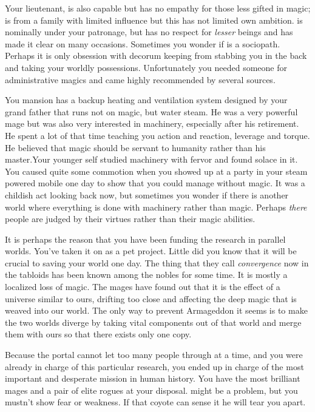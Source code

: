 \documentclass[char]{guildcamp3}
\begin{document}
Your lieutenant, \cNobleTwo{\intro} is also capable but has no empathy for those less gifted in magic;  is from a family with limited influence but this has not limited  own ambition. \cNobleTwo{} is nominally under your patronage, but  has no respect for \emph{lesser} beings and has made it clear on many occasions. Sometimes you wonder if \cNobleTwo{} is a sociopath. Perhaps it is only  obsession with decorum keeping  from stabbing you in the back and taking your worldly possessions. Unfortunately you needed someone for administrative magics and \cNobleTwo{} came highly recommended by several sources. 

You mansion has a backup heating and ventilation system designed by your grand father that runs not on magic, but water steam. He was a very powerful mage but was also very interested in machinery, especially after his retirement. He spent a lot of that time teaching you action and reaction, leverage and torque. He believed that magic should be servant to humanity rather than his master.Your younger self studied machinery with fervor and found solace in it. You caused quite some commotion when you showed up at a party in your steam powered mobile one day to show that you could manage without magic. It was a childish act looking back now, but sometimes you wonder if there is another world where everything is done with machinery rather than magic. Perhaps \emph{there} people are judged by their virtues rather than their magic abilities.

It is perhaps the reason that you have been funding the research in parallel worlds. You've taken it on as a pet project. Little did you know that it will be crucial to saving your world one day. The thing that they call \emph{convergence} now in the tabloids has been known among the nobles for some time. It is mostly a localized loss of magic. The mages have found out that it is the effect of a universe similar to ours, drifting too close and affecting the deep magic that is weaved into our world. The only way to prevent Armageddon it seems is to make the two worlds diverge by taking vital components out of that world and merge them with ours so that there exists only one copy.  

Because the portal cannot let too many people through at a time, and you were already in charge of this particular research, you ended up in charge of the most important and desperate mission in human history. You have the most brilliant mages and a pair of elite rogues at your disposal. \cNobleTwo{} might be a problem, but you mustn't show fear or weakness. If that coyote can sense it he will tear you apart. 
\end{document}
